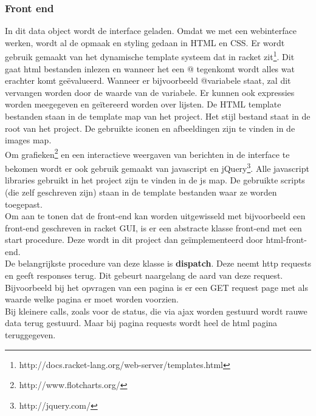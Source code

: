 \documentclass{article}
\begin{document}

\subsubsection{Front end}
\label{ssub:front-end}
In dit data object wordt de interface geladen. Omdat we met een webinterface werken, wordt al de opmaak en styling gedaan in HTML en CSS. Er wordt gebruik gemaakt van het dynamische template systeem dat in racket zit\footnote{http://docs.racket-lang.org/web-server/templates.html}. Dit gaat html bestanden inlezen en wanneer het een @ tegenkomt wordt alles wat erachter komt ge\"evalueerd. Wanneer er bijvoorbeeld @variabele staat, zal dit vervangen worden door de waarde van de variabele. Er kunnen ook expressies worden meegegeven en ge\"itereerd worden over lijsten. De HTML template bestanden staan in de template map van het project. Het stijl bestand staat in de root van het project. De gebruikte iconen en afbeeldingen zijn te vinden in de images map.\\
Om grafieken\footnote{http://www.flotcharts.org/} en een interactieve weergaven van berichten in  de interface te bekomen wordt er ook gebruik gemaakt van javascript en jQuery\footnote{http://jquery.com/}. Alle javascript libraries gebruikt in het project zijn te vinden in de js map. De gebruikte scripts (die zelf geschreven zijn) staan in de template bestanden waar ze worden toegepast.\\
Om aan te tonen dat de front-end kan worden uitgewisseld met bijvoorbeeld een front-end geschreven in racket GUI, is er een abstracte klasse front-end met een start procedure. Deze wordt in dit project dan ge\"implementeerd door html-front-end.\\
De belangrijkste procedure van deze klasse is \textbf{dispatch}. Deze neemt http requests en geeft responses terug. Dit gebeurt naargelang de aard van deze request. Bijvoorbeeld bij het opvragen van een pagina is er een GET request page met als waarde welke pagina er moet worden voorzien. \\
Bij kleinere calls, zoals voor de status, die via ajax worden gestuurd wordt rauwe data terug gestuurd. Maar bij pagina requests wordt heel de html pagina teruggegeven.\\ 
\end{document}
